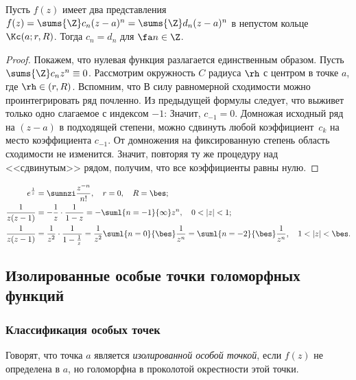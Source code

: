 \documentclass[a4paper]{article}
\begin{document}
\begin{theorem}
Пусть $f(z)$ имеет два представления $f(z)=\sums{\Z}c_n(z-a)^n = \sums{\Z}d_n(z-a)^n$ в непустом кольце $\Kc(a;r,R)$.
Тогда $c_n=d_n$ для $\fa n \in \Z$.
\end{theorem}
\begin{proof}
Покажем, что нулевая функция разлагается единственным образом. Пусть $\sums{\Z}c_n z^n \equiv 0$.
Рассмотрим окружность $C$ радиуса $\rh$ с центром в точке $a$, где $\rh \in (r, R)$.
Вспомним, что
В силу равномерной сходимости можно проинтегрировать ряд почленно. Из предыдущей формулы следует, что выживет
только одно слагаемое с индексом $-1$:
Значит, $c_{-1} = 0$. Домножая исходный ряд на $(z-a)$ в подходящей степени, можно сдвинуть любой
коэффициент~$c_k$ на место коэффициента $c_{-1}$. От домножения на фиксированную степень область сходимости
не изменится. Значит, повторяя ту же процедуру над <<сдвинутым>> рядом, получим, что все коэффициенты равны нулю.
\end{proof}

\begin{ex}
\begin{align*}
e^{\frac1z}&=\sumnzi\frac{z^{-n}}{n!}, \quad r=0, \quad R= \bes;\\
\frac{1}{z(z-1)}&=-\frac1z\cdot \frac{1}{1-z}= -\suml{n=-1}{\infty}z^n, \quad 0<|z|<1;\\
\frac{1}{z(z-1)}&=\frac{1}{z^2}\cdot \frac{1}{1-\frac1z}=  \frac{1}{z^2}\suml{n=0}{\bes}\frac{1}{z^n}= \suml{n=-2}{\bes}\frac{1}{z^n}, \quad 1<|z|< \bes.
\end{align*}
\end{ex}

\subsection{Изолированные особые точки голоморфных функций}

\subsubsection{Классификация особых точек}

\begin{df}
Говорят, что точка $a$ является \emph{изолированной особой точкой}, если $f(z)$ не определена в $a$,
но голоморфна в проколотой окрестности этой точки.
\end{df}
\end{document}
